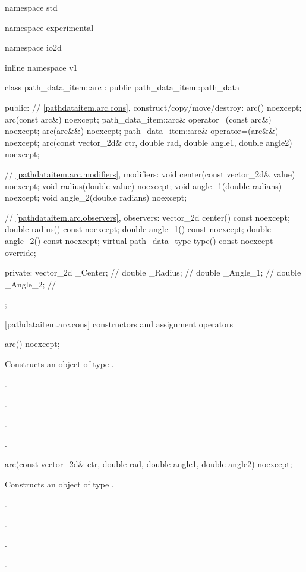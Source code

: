 \begin{codeblock}
namespace std { namespace experimental { namespace io2d { inline namespace v1 {
  class path_data_item::arc : public path_data_item::path_data {
  public:
    // \ref{pathdataitem.arc.cons}, construct/copy/move/destroy:
    arc() noexcept;
    arc(const arc&) noexcept;
    path_data_item::arc& operator=(const arc&) noexcept;
    arc(arc&&) noexcept;
    path_data_item::arc& operator=(arc&&) noexcept;
    arc(const vector_2d& ctr, double rad, double angle1, double angle2) noexcept;

    // \ref{pathdataitem.arc.modifiers}, modifiers:
    void center(const vector_2d& value) noexcept;
    void radius(double value) noexcept;
    void angle_1(double radians) noexcept;
    void angle_2(double radians) noexcept;

    // \ref{pathdataitem.arc.observers}, observers:
    vector_2d center() const noexcept;
    double radius() const noexcept;
    double angle_1() const noexcept;
    double angle_2() const noexcept;
    virtual path_data_type type() const noexcept override;

  private:
    vector_2d _Center; // \expos
    double _Radius;    // \expos
    double _Angle_1;   // \expos
    double _Angle_2;   // \expos
  };
} } } }
\end{codeblock}

 [pathdataitem.arc.cons] { constructors and assignment operators}

\begin{itemdecl}
    arc() noexcept;
\end{itemdecl}
\begin{itemdescr}
	\pnum
	\effects
	Constructs an object of type .
	
	\pnum
	\postconditions
	.

	.

	.

	.
\end{itemdescr}

\begin{itemdecl}
    arc(const vector_2d& ctr, double rad, double angle1, double angle2) noexcept;
\end{itemdecl}
\begin{itemdescr}
	\pnum
	\effects
	Constructs an object of type .
	
	\pnum
	\postconditions
	.

	.

	.

	.
\end{itemdescr}


